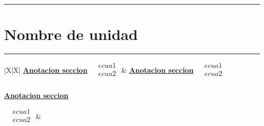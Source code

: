 \documentclass[../main.tex]{subfiles}
\begin{document}
\vspace{0.2in}
\hrule
\vspace{0.2in}
\section{Nombre de unidad}
\vspace{0.1in}
\hrule
\begin{xltabular}{\textwidth}{|X|X|}
	\hline
	\underline{\textbf{Anotacion seccion}}
	\newline\newline
	$\begin{aligned}
			 & ecua1 \\
			 & ecua2 \\
		\end{aligned}$
	\newline\newline
	&
	\underline{\textbf{Anotacion seccion}}
	\newline\newline
	$\begin{aligned}
			 & ecua1 \\
			 & ecua2 \\
		\end{aligned}$
	\newline\newline
	\\
	\hline
	\\
	\hline
	\underline{\textbf{Anotacion seccion}}

	$\begin{aligned}
			 & ecua1 \\
			 & ecua2 \\
		\end{aligned}$
	\newline\newline
	&
	 \\
	\hline
\end{xltabular}
\end{document}

